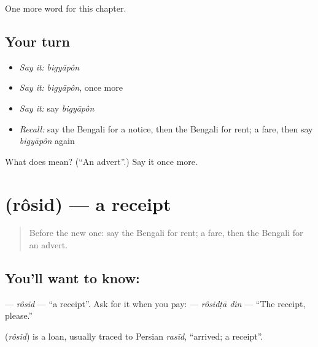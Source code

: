 \begin{grammarlens}[title={What you've built}]
One more word for this chapter.
\end{grammarlens}

\subsection*{Your turn}
\begin{itemize}
\raggedright
  \item \emph{Say it:} \emph{bigyāpôn}
  \item \emph{Say it:} \emph{bigyāpôn}, once more
  \item \emph{Say it:} say \emph{bigyāpôn}
  \item \emph{Recall:} say the Bengali for a notice, then the Bengali for rent; a fare, then say \emph{bigyāpôn} again
\end{itemize}

\begin{tcolorbox}[breakable,colback=teal!4,colframe=teal!35!black,title={Before you move on}]
What does  mean? (\textquotedblleft{}An advert\textquotedblright{}.) Say it once more.
\end{tcolorbox}
\section[\texorpdfstring{\bn{রসিদ} (rôsid)}{রসিদ (rôsid)}]{ (rôsid) — a receipt}

\label{lesson:BN-C147-rosid}



\begin{quote}
Before the new one: say the Bengali for rent; a fare, then the Bengali for an advert.
\end{quote}

\subsection*{You'll want to know: }
\textbf{} — \emph{rôsid} — \textquotedblleft{}a receipt\textquotedblright{}. Ask for it when you pay: \textbf{ } — \emph{rôsidṭā din} — \textquotedblleft{}The receipt, please.\textquotedblright{}

\begin{cousinweb}
\textbf{} (\emph{rôsid}) is a loan, usually traced to Persian \emph{rasīd}, \textquotedblleft{}arrived; a receipt\textquotedblright{}.
\end{cousinweb}

